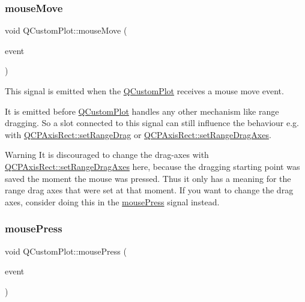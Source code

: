 \subsubsection{\texorpdfstring{mouse\+Move}{mouseMove}}
{\footnotesize\ttfamily void Q\+Custom\+Plot\+::mouse\+Move (\begin{DoxyParamCaption}\item[{Q\+Mouse\+Event $\ast$}]{event }\end{DoxyParamCaption})\hspace{0.3cm}{\ttfamily [signal]}}

This signal is emitted when the \hyperlink{class_q_custom_plot}{Q\+Custom\+Plot} receives a mouse move event.

It is emitted before \hyperlink{class_q_custom_plot}{Q\+Custom\+Plot} handles any other mechanism like range dragging. So a slot connected to this signal can still influence the behaviour e.\+g. with \hyperlink{class_q_c_p_axis_rect_ae6aef2f7211ba6097c925dcd26008418}{Q\+C\+P\+Axis\+Rect\+::set\+Range\+Drag} or \hyperlink{class_q_c_p_axis_rect_a648cce336bd99daac4a5ca3e5743775d}{Q\+C\+P\+Axis\+Rect\+::set\+Range\+Drag\+Axes}.

\begin{DoxyWarning}{Warning}
It is discouraged to change the drag-\/axes with \hyperlink{class_q_c_p_axis_rect_a648cce336bd99daac4a5ca3e5743775d}{Q\+C\+P\+Axis\+Rect\+::set\+Range\+Drag\+Axes} here, because the dragging starting point was saved the moment the mouse was pressed. Thus it only has a meaning for the range drag axes that were set at that moment. If you want to change the drag axes, consider doing this in the \hyperlink{class_q_custom_plot_aca75bf9afb5dd19349c375de2a87a051}{mouse\+Press} signal instead. 
\end{DoxyWarning}
\hypertarget{class_q_custom_plot_aca75bf9afb5dd19349c375de2a87a051}{}\label{class_q_custom_plot_aca75bf9afb5dd19349c375de2a87a051} 
\subsubsection{\texorpdfstring{mouse\+Press}{mousePress}}
{\footnotesize\ttfamily void Q\+Custom\+Plot\+::mouse\+Press (\begin{DoxyParamCaption}\item[{Q\+Mouse\+Event $\ast$}]{event }\end{DoxyParamCaption})\hspace{0.3cm}{\ttfamily [signal]}}

